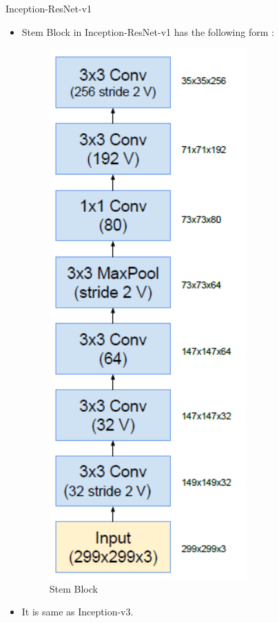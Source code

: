 \documentclass{beamer}
\begin{document}
\begin{frame}{Inception-ResNet-v1}
	\begin{itemize}
		\item Stem Block in Inception-ResNet-v1 has the following form :
		\vspace{7pt}
		\begin{figure}[h]		
			\centering
			\includegraphics[scale=0.33]{./in_res_v1/stem.PNG}
			\caption{Stem Block}
			\label{steminresv1}
		\end{figure}
		\item It is same as Inception-v3.
	\end{itemize}
\end{frame}
\end{document}
